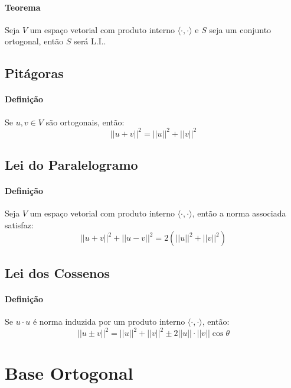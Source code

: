 \documentclass{article}
\begin{document}
            \paragraph{Teorema}Seja $V$ um espaço vetorial com produto interno $\langle\cdot,\cdot\rangle$ e $S$ seja um conjunto ortogonal, então $S$ será L.I.. 

        \subsection{Pitágoras}
            \paragraph{Definição}Se $u, v \in V$ são ortogonais, então:
                \[\boxed{||u + v||^{2} = ||u||^{2} + ||v||^{2}}\]

        \subsection{Lei do Paralelogramo}
            \paragraph{Definição}Seja $V$ um espaço vetorial com produto interno $\langle\cdot,\cdot\rangle$, então a norma associada satisfaz:
                \[\boxed{||u + v||^{2} + ||u - v||^{2} = 2 \left(||u||^{2} + ||v||^{2}\right)}\]

        \subsection{Lei dos Cossenos}
            \paragraph{Definição}Se $u\cdot u$ é norma induzida por um produto interno $\langle\cdot,\cdot\rangle$, então:
                \[\boxed{||u\pm v||^{2} = ||u||^{2} + ||v||^{2} \pm 2||u||\cdot||v||\cos\theta}\]
\newpage

    \section{Base Ortogonal}
\end{document}
